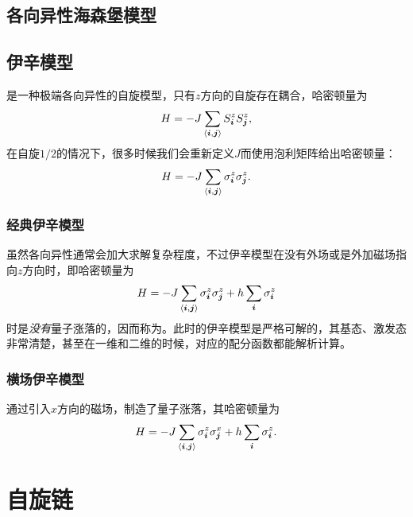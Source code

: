 \section{各向异性海森堡模型}


\section{伊辛模型}

是一种极端各向异性的自旋模型，只有$z$方向的自旋存在耦合，哈密顿量为
\begin{equation}
    H = - J \sum_{\langle \vb*{i}, \vb*{j} \rangle} S_{\vb*{i}}^z S_{\vb*{j}}^z ,
\end{equation}
在自旋$1/2$的情况下，很多时候我们会重新定义$J$而使用泡利矩阵给出哈密顿量：
\begin{equation}
    H = - J \sum_{\langle \vb*{i}, \vb*{j} \rangle} \sigma^z_{\vb*{i}} \sigma^z_{\vb*{j}}.
\end{equation}

\subsection{经典伊辛模型}

虽然各向异性通常会加大求解复杂程度，不过伊辛模型在没有外场或是外加磁场指向$z$方向时，即哈密顿量为
\begin{equation}
    H = - J \sum_{\langle \vb*{i}, \vb*{j} \rangle} \sigma^z_{\vb*{i}} \sigma^z_{\vb*{j}} + h \sum_{\vb*{i}} \sigma^z_{\vb*{i}}
\end{equation}
时是\emph{没有}量子涨落的，因而称为。此时的伊辛模型是严格可解的，其基态、激发态非常清楚，甚至在一维和二维的时候，对应的配分函数都能解析计算。

\subsection{横场伊辛模型}

通过引入$x$方向的磁场，制造了量子涨落，其哈密顿量为
\begin{equation}
    H = - J \sum_{\langle \vb*{i}, \vb*{j} \rangle} \sigma^z_{\vb*{i}} \sigma^x_{\vb*{j}} + h \sum_{\vb*{i}} \sigma^z_{\vb*{i}}.
\end{equation}

\chapter{自旋链}

